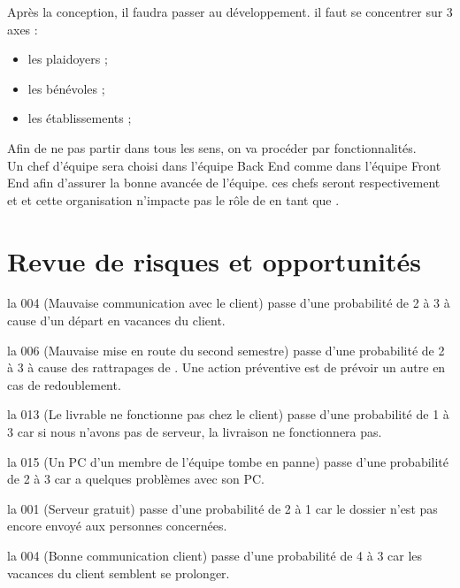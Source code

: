 \documentclass [a4paper] {article}
\begin{document}
\indent
Après la conception, il faudra passer au développement. il faut se concentrer sur 3 axes : 
\begin{itemize}
\item les plaidoyers ;
\item les bénévoles ;
\item les établissements ;
\end{itemize}
Afin de ne pas partir dans tous les sens, on va procéder par fonctionnalités. \\

\indent
Un chef d'équipe sera choisi dans l'équipe Back End comme dans l'équipe Front End afin d'assurer la bonne avancée de l'équipe. ces chefs seront respectivement \Florian{} et \Julie{} et cette organisation n'impacte pas le rôle de \Michel{} en tant que \RD{}.



\section{Revue de risques et opportunités}

la \FDR{} 004 (Mauvaise communication avec le client) passe d'une probabilité de 2 à 3 à cause d'un départ en vacances du client.



la \FDR{} 006 (Mauvaise mise en route du second semestre) passe d'une probabilité de 2 à 3 à cause des rattrapages de \Pierre. Une action préventive est de prévoir un autre \CP{} en cas de redoublement.

la \FDR{} 013 (Le livrable ne fonctionne pas chez le client) passe d'une probabilité de 1 à 3 car si nous n'avons pas de serveur, la livraison ne fonctionnera pas.

la \FDR{} 015 (Un PC d’un membre de l’équipe tombe en panne) passe d'une probabilité de 2 à 3 car \Florian{} a quelques problèmes avec son PC.

la \FDO{} 001 (Serveur gratuit) passe d'une probabilité de 2 à 1 car le dossier n'est pas encore envoyé aux personnes concernées.

la \FDO{} 004 (Bonne communication client) passe d'une probabilité de 4 à 3 car les vacances du client semblent se prolonger.
 



\end{document}
